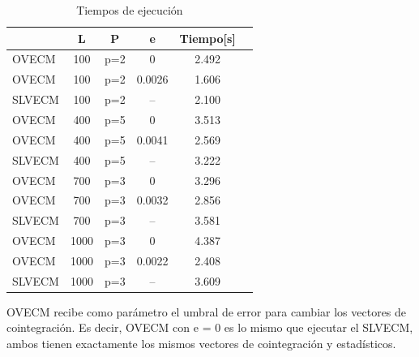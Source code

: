 \begin{table}[h!]
\caption{Tiempos de ejecución}
\label{tab:extimes}
\begin{center}
\begin{tabular}{|l|c|c|c|c|c|}
\hline
& L & P & e  & Tiempo[s] \\
\hline
OVECM & 100 &p=2  & 0      & 2.492\\
OVECM & 100 &p=2  & 0.0026  & 1.606\\
SLVECM & 100 &p=2& -- & 2.100\\
\hline
OVECM & 400 & p=5  & 0      & 3.513\\
OVECM & 400 &p=5  & 0.0041  & 2.569\\
SLVECM & 400 & p=5 & -- & 3.222\\
\hline
OVECM & 700 &p=3  & 0      & 3.296\\
OVECM & 700 &p=3  & 0.0032  & 2.856\\
SLVECM & 700 &p=3 & -- & 3.581\\
\hline
OVECM & 1000 & p=3 & 0      & 4.387\\
OVECM & 1000 & p=3  & 0.0022  & 2.408\\
SLVECM & 1000 & p=3  & -- & 3.609\\
\hline
\end{tabular}
\end{center}
\end{table}

OVECM recibe como parámetro el umbral de error para cambiar los vectores de
cointegración. Es decir, OVECM con e = 0 es lo mismo que ejecutar el SLVECM,
ambos tienen exactamente los mismos vectores de cointegración y estadísticos.

